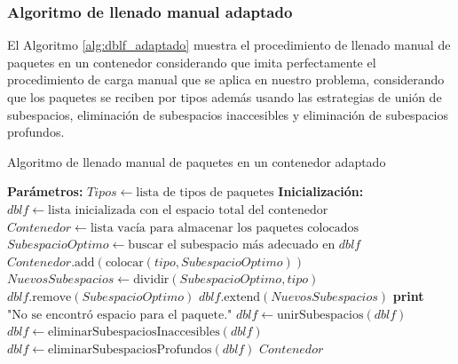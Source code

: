 \documentclass[openany]{article}
\begin{document}
\subsubsection{Algoritmo de llenado manual adaptado}

El Algoritmo \ref{alg:dblf_adaptado} muestra el procedimiento de llenado manual de paquetes en un contenedor considerando que imita perfectamente el procedimiento de carga manual que se aplica en nuestro problema, considerando que los paquetes se reciben por tipos además usando las estrategias de unión de subespacios, eliminación de subespacios inaccesibles y eliminación de subespacios profundos.

\begin{algorithm}[H]
    \caption{Algoritmo de llenado manual de paquetes en un contenedor adaptado}
    \label{alg:dblf_adaptado}
    \begin{algorithmic}[1]
        \State \textbf{Parámetros:} $Tipos \gets \text{lista de tipos de paquetes}$
        \State \textbf{Inicialización:} $dblf \gets \text{lista inicializada con el espacio total del contenedor}$
        \State $Contenedor \gets \text{lista vacía para almacenar los paquetes colocados}$
        \State $SubespacioOptimo \gets \text{buscar el subespacio más adecuado en } dblf$
        \State $Contenedor.\text{add}( \text{colocar}(tipo, SubespacioOptimo) )$
        \State $NuevosSubespacios \gets \text{dividir}(SubespacioOptimo, tipo)$
        \State $dblf.\text{remove}(SubespacioOptimo)$
        \State $dblf.\text{extend}(NuevosSubespacios)$
        \Else
        \State \textbf{print} $\text{"No se encontró espacio para el paquete."}$
        \EndIf
        \EndFor
        \State $dblf \gets \text{unirSubespacios}(dblf)$
        \State $dblf \gets \text{eliminarSubespaciosInaccesibles}(dblf)$
        \State $dblf \gets \text{eliminarSubespaciosProfundos}(dblf)$
        \EndFor
        \State \Return $Contenedor$
    \end{algorithmic}
\end{algorithm}
\end{document}
